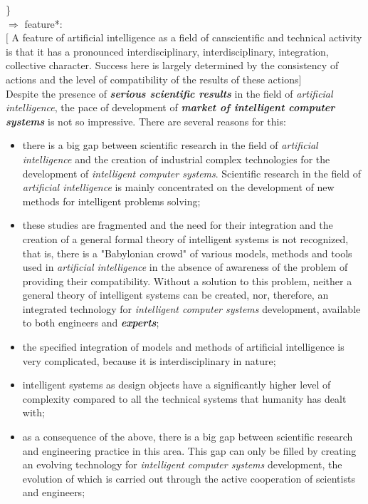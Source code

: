\documentclass[10pt, a4paper]{proc}
\begin{document}
 \}\\
 \(\Rightarrow\) feature*:\\
 \indent\([\)
 A feature of artificial intelligence as a field of canscientific and technical activity is that it has a pronounced interdisciplinary, interdisciplinary, integration, collective character. Success here is largely determined by the consistency of actions and the level of compatibility of the results of these actions]\\

 \indent Despite the presence of \textbf{\textit{serious scientific results}} in the field of \textit{artificial intelligence}, the pace of development of \textbf{\textit{market of intelligent computer systems}} is not so impressive. There are several reasons for this:
 \begin{itemize}
  \item there is a big gap between scientific research in the field of \textit{artificial intelligence} and the creation of industrial complex technologies for the development of \textit{intelligent computer systems}. Scientific research in the field of \textit{artificial intelligence} is mainly concentrated on the development of new methods for intelligent problems solving;
  \item these studies are fragmented and the need for their integration and the creation of a general formal theory of intelligent systems is not recognized, that is, there is a "Babylonian crowd" of various models, methods and tools used in \textit{artificial intelligence} in the absence of awareness of the problem of providing their compatibility. Without a solution to this problem, neither a general theory of intelligent systems can be created, nor, therefore, an integrated technology for \textit{intelligent computer systems} development, available to both engineers and \textbf{\textit{experts}};
  \item the specified integration of models and methods of artificial intelligence is very complicated, because it is interdisciplinary in nature;
  \item intelligent systems as design objects have a significantly higher level of complexity compared to all the technical systems that humanity has dealt with;
  \item as a consequence of the above, there is a big gap between scientific research and engineering practice in this area. This gap can only be filled by creating an evolving technology for \textit{intelligent computer systems} development, the evolution of which is carried out through the active cooperation of scientists and engineers;

\end{itemize}
\end{document}
